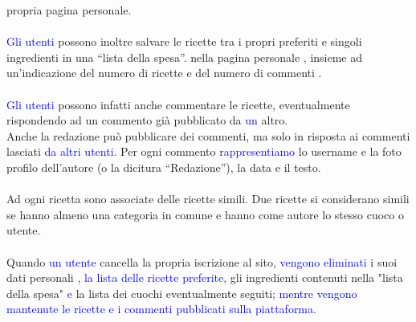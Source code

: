 \documentclass[12pt]{extarticle}
\begin{document}
propria pagina personale.
\\\\
 \textcolor{blue}{Gli utenti} possono inoltre salvare le ricette tra i propri preferiti e singoli ingredienti in una “lista
della spesa”.  nella pagina personale ,
insieme ad un’indicazione del numero di ricette e del numero di commenti .
\\\\
 \textcolor{blue}{Gli utenti} possono infatti anche commentare le ricette, eventualmente rispondendo ad un
commento già pubblicato da  \textcolor{blue}{un} altro. 
\\
Anche la redazione può pubblicare dei commenti, ma solo in risposta ai commenti 
lasciati  \textcolor{blue}{da altri utenti}. Per ogni commento  \textcolor{blue}{rappresentiamo} lo
username e la foto profilo dell’autore (o la dicitura “Redazione”), la data e il testo.
\\\\
Ad ogni ricetta sono associate delle ricette simili. Due ricette si considerano simili se hanno
almeno una categoria in comune e hanno come autore lo stesso cuoco o utente.
\\\\
Quando  \textcolor{blue}{un utente} cancella la propria iscrizione al sito, \textcolor{blue}{vengono eliminati}  i suoi dati personali \textcolor{blue}{, la lista delle ricette preferite}, gli ingredienti contenuti nella "lista della spesa" \textcolor{blue}{e} la lista
dei cuochi eventualmente seguiti\textcolor{blue}{; mentre vengono mantenute le ricette e i commenti pubblicati sulla piattaforma}. 

\newpage
\end{document}
